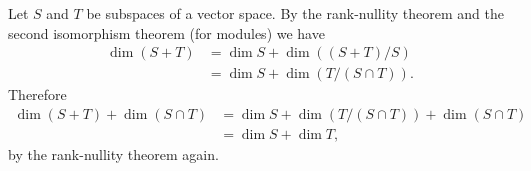 \documentclass[12pt]{article}
\def\dim{\operatorname{dim}}
\begin{document}
Let $S$ and $T$ be subspaces of a vector space.
By the rank-nullity theorem and the second isomorphism theorem (for modules)
we have
\begin{align*}
\dim(S+T) &= \dim S + \dim((S+T)/S) \\
          &= \dim S + \dim(T/(S\cap T)).
\end{align*}
Therefore
\begin{align*}
\dim(S+T) + \dim(S\cap T) &= \dim S + \dim(T/(S\cap T)) + \dim(S\cap T) \\
                          &= \dim S + \dim T,
\end{align*}
by the rank-nullity theorem again.


\end{document}
